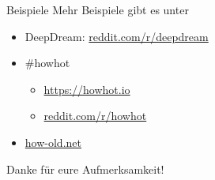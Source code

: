 \begin{frame}{Beispiele}
    Mehr Beispiele gibt es unter

    \begin{itemize}
        \item DeepDream: \href{https://www.reddit.com/r/deepdream/}{reddit.com/r/deepdream}
        \item \#howhot
        \begin{itemize}
            \item \href{https://howhot.io/}{https://howhot.io}
            \item \href{https://www.reddit.com/r/howhot/}{reddit.com/r/howhot}
        \end{itemize}
        \item \href{http://how-old.net/}{how-old.net}
    \end{itemize}

    \begin{center}
        \Huge Danke für eure Aufmerksamkeit!
    \end{center}
\end{frame}
